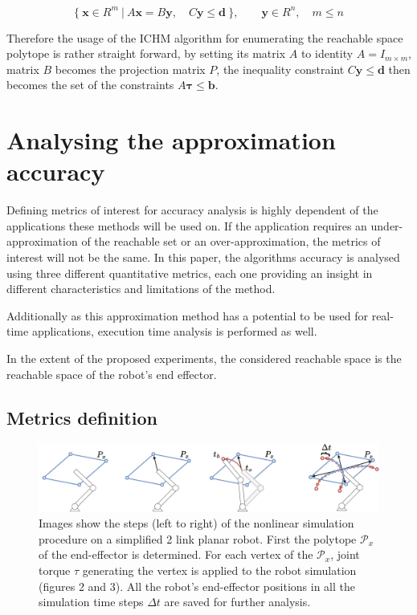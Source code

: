 \begin{equation}
\{ ~\bm{x}\in R^{m} ~|~ A\bm{x} = B\bm{y},\quad C\bm{y} \leq \bm{d}~\}, \qquad \bm{y} \in R^n,\quad m \leq n
\end{equation}

Therefore the usage of the ICHM algorithm for enumerating the reachable space polytope is rather straight forward, by setting its matrix $A$ to identity $A=I_{m \times m}$, matrix $B$ becomes the projection matrix $P$, the inequality constraint $C\bm{y} \leq \bm{d}$ then becomes the set of the constraints $A\bm{\tau}\leq\bm{b}$.


\section{Analysing the approximation accuracy}
\label{ch:analysis}

Defining metrics of interest for accuracy analysis is highly dependent of the applications these methods will be used on. If the application requires an under-approximation of the reachable set or an over-approximation, the metrics of interest will not be the same. In this paper, the algorithms accuracy is analysed using three different quantitative metrics, each one providing an insight in different characteristics and limitations of the method. 

Additionally as this approximation method has a potential to be used for real-time applications, execution time analysis is performed as well. 

In the extent of the proposed experiments, the considered reachable space is the reachable space of the robot's end effector. 

\subsection{Metrics definition}


\begin{figure}[!t]
    \centering
    \includegraphics[width=\linewidth]{Papers/images/simulation.pdf}
    \caption{Images show the steps (left to right) of the nonlinear simulation procedure on a simplified 2 link planar robot. First the polytope $\mathcal{P}_x$ of the end-effector is determined. For each vertex of the $\mathcal{P}_x$, joint torque $\tau$ generating the vertex is applied to the robot simulation (figures 2 and 3). All the robot's end-effector positions in all the simulation time steps $\Delta t$ are saved for further analysis.}
    \label{fig:simulation}

\end{figure}

